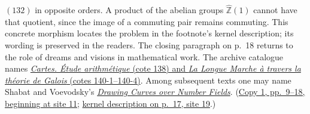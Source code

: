 $(132)$ in opposite orders. A product of the abelian groups
$\hat{\mathbb Z}(1)$ cannot have that quotient, since the image of a
commuting pair remains commuting. This concrete morphism locates the
problem in the footnote's kernel description; its wording is preserved
in the readers. The closing paragraph on p.~18 returns to the role of
dreams and visions in mathematical work. The archive catalogue names
\href{https://grothendieck.umontpellier.fr/archives-grothendieck/}{\emph{Cartes. Étude arithmétique} (cote 138) and \emph{La Longue Marche à travers la théorie de Galois} (cotes 140-1--140-4)}.
Among subsequent texts one may
name Shabat and Voevodsky's
\href{https://www.math.ias.edu/vladimir/node/79}{\emph{Drawing Curves over Number Fields}}.
(\href{https://grothendieck.umontpellier.fr/web/viewer.html?file=../119.pdf\#page=12}{Copy 1, pp.~9--18, beginning at site 11};
\href{https://grothendieck.umontpellier.fr/web/viewer.html?file=../119.pdf\#page=20}{kernel description on p.~17, site 19}.)

